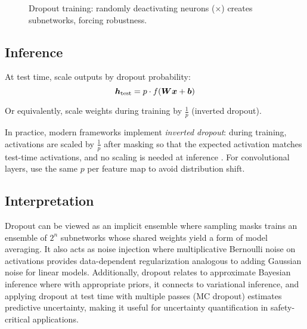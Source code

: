 \begin{figure}[htbp]
\caption{Dropout training: randomly deactivating neurons ($\times$) creates subnetworks, forcing robustness.}
\label{fig:dropout-training-process}
\end{figure}

\subsection{Inference}

At test time, scale outputs by dropout probability:
\begin{equation}
\boldsymbol{h}_{\text{test}} = p \cdot f(\boldsymbol{W}\boldsymbol{x} + \boldsymbol{b})
\end{equation}

Or equivalently, scale weights during training by $\frac{1}{p}$ (inverted dropout).

In practice, modern frameworks implement \emph{inverted dropout}: during training, activations are scaled by $\tfrac{1}{p}$ after masking so that the expected activation matches test-time activations, and no scaling is needed at inference \cite{Srivastava2014,GoodfellowEtAl2016}. For convolutional layers, use the same $p$ per feature map to avoid distribution shift.

\subsection{Interpretation}

Dropout can be viewed as an implicit ensemble where sampling masks trains an ensemble of $2^n$ subnetworks whose shared weights yield a form of model averaging. It also acts as noise injection where multiplicative Bernoulli noise on activations provides data-dependent regularization analogous to adding Gaussian noise for linear models. Additionally, dropout relates to approximate Bayesian inference where with appropriate priors, it connects to variational inference, and applying dropout at test time with multiple passes (MC dropout) estimates predictive uncertainty, making it useful for uncertainty quantification in safety-critical applications.

